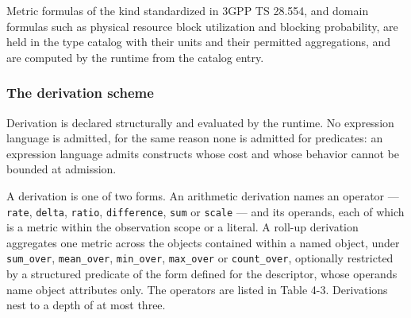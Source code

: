 Metric formulas of the kind standardized in 3GPP TS 28.554, and domain
formulas such as physical resource block utilization and blocking
probability, are held in the type catalog with their units and their
permitted aggregations, and are computed by the runtime from the catalog
entry.

\hypertarget{the-derivation-scheme}{%
\subsubsection{The derivation scheme}\label{the-derivation-scheme}}

Derivation is declared structurally and evaluated by the runtime. No
expression language is admitted, for the same reason none is admitted
for predicates: an expression language admits constructs whose cost and
whose behavior cannot be bounded at admission.

A derivation is one of two forms. An arithmetic derivation names an
operator --- \texttt{rate}, \texttt{delta}, \texttt{ratio},
\texttt{difference}, \texttt{sum} or \texttt{scale} --- and its
operands, each of which is a metric within the observation scope or a
literal. A roll-up derivation aggregates one metric across the objects
contained within a named object, under \texttt{sum\_\allowbreak{}over},
\texttt{mean\_\allowbreak{}over}, \texttt{min\_\allowbreak{}over}, \texttt{max\_\allowbreak{}over} or
\texttt{count\_\allowbreak{}over}, optionally restricted by a structured predicate of
the form defined for the descriptor, whose operands name object
attributes only. The operators are listed in Table 4-3. Derivations nest
to a depth of at most three.


